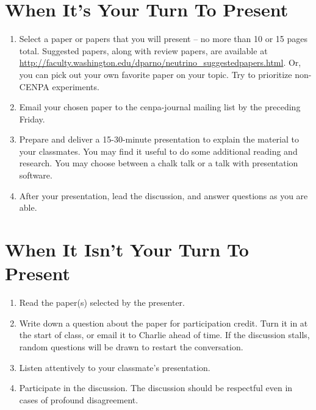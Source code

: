 \documentclass[12pt]{amsart}
\begin{document}
\section{When It's Your Turn To Present}
\begin{enumerate}
	\item	Select a paper or papers that you will present -- no more than 10 or 15 pages total. Suggested papers, along with review papers, are available at \url{http://faculty.washington.edu/dparno/neutrino_suggestedpapers.html}. Or, you can pick out your own favorite paper on your topic. Try to prioritize non-CENPA experiments. 
	\item	Email your chosen paper to the cenpa-journal mailing list by the preceding Friday.
	\item	Prepare and deliver a 15-30-minute presentation to explain the material to your classmates. You may find it useful to do some additional reading and research. You may choose between a chalk talk or a talk with presentation software.
	\item	After your presentation, lead the discussion, and answer questions as you are able.
\end{enumerate}

\section{When It Isn't Your Turn To Present}
\begin{enumerate}
	\item	Read the paper(s) selected by the presenter.
	\item	Write down a question about the paper for participation credit. Turn it in at the start of class, or email it to Charlie ahead of time. If the discussion stalls, random questions will be drawn to restart the conversation.
	\item	Listen attentively to your classmate's presentation.
	\item	Participate in the discussion. The discussion should be respectful even in cases of profound disagreement.
\end{enumerate}
\end{document}
